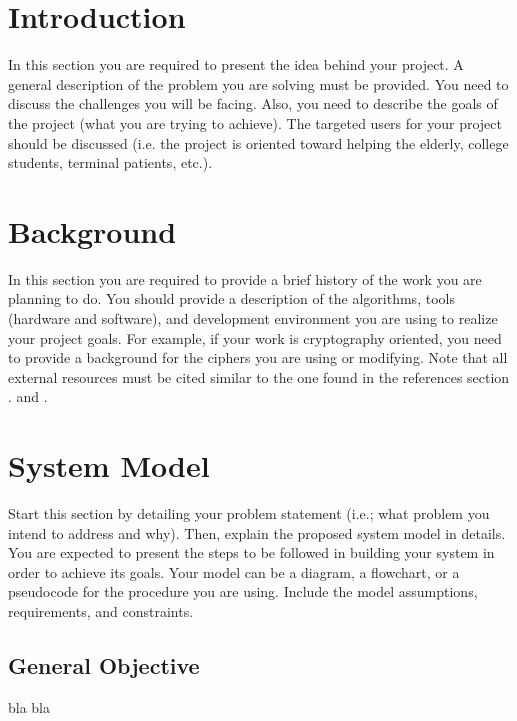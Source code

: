 \documentclass[10pt]{article}
\begin{document}
\newpage																		

\tableofcontents 

\newpage

\section{Introduction}

In this section you are required to present the idea behind your project. A general description of the problem you are solving must be provided. You need to discuss the challenges you will be facing. Also, you need to describe the goals of the project (what you are trying to achieve).  The targeted users for your project should be discussed (i.e. the project is oriented toward helping the elderly, college students, terminal patients, etc.).


 
\section{Background}
In this section you are required to provide a brief history of the work you are planning to do. You should provide a description of the algorithms, tools (hardware and software), and development environment you are using to realize your project goals. For example, if your work is cryptography oriented, you need to provide a background for the ciphers you are using or modifying. Note that all external resources must be cited similar to the one found in the references section \cite{IEEEreferencias:Ref1}. and \cite{1989:Rabiner}.

\section{System Model}
Start this section by detailing your problem statement (i.e.; what problem you intend to address and why). Then, explain the proposed system model in details. You are expected to present the steps to be followed in building your system in order to achieve its goals. Your model can be a diagram, a flowchart, or a pseudocode for the procedure you are using. Include the model assumptions, requirements, and constraints. 

\subsection{General Objective}
bla bla 
\end{document}
